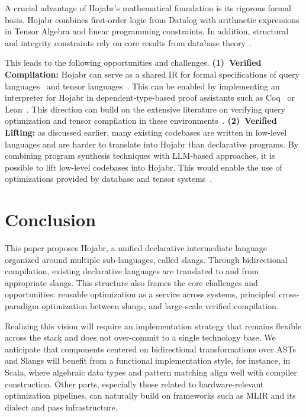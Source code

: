 \documentclass[sigconf,nonacm]{acmart}
\begin{document}
A crucial advantage of Hojabr's mathematical foundation is its rigorous formal basis. Hojabr combines first-order logic from Datalog with arithmetic expressions in Tensor Algebra and linear programming constraints. In addition, structural and integrity constraints rely on core results from database theory~\cite{abiteboul1995foundations}.

This leads to the following opportunities and challenges. \textbf{(1)~Verified Compilation:} Hojabr can serve as a shared IR for formal specifications of query languages~\cite{DBLP:conf/cidr/0001L24} and tensor languages~\cite{kovach2023indexed,liu2024verified}. This can be enabled by implementing an interpreter for Hojabr in dependent-type-based proof assistants such as Coq~\cite{barras1997coq} or Lean~\cite{de2015lean}. This direction can build on the extensive literature on verifying query optimization and tensor compilation in these environments~\cite{liu2022verified,DBLP:journals/pacmpl/AuerbachHMSS17,DBLP:conf/pldi/ChuWCS17}. 
\textbf{(2)~Verified Lifting:} as discussed earlier, many existing codebases are written in low-level languages and are harder to translate into Hojabr than declarative programs. By combining program synthesis techniques with LLM-based approaches, it is possible to lift low-level codebases into Hojabr. This would enable the use of optimizations provided by database and tensor systems~\cite{cheung2013optimizing, li2025guided}.

\section{Conclusion}
This paper proposes Hojabr, a unified declarative intermediate language organized around multiple sub-languages, called slangs. Through bidirectional compilation, existing declarative languages are translated to and from appropriate slangs. This structure also frames the core challenges and opportunities: reusable optimization as a service across systems, principled cross-paradigm optimization between slangs, and large-scale verified compilation. 

Realizing this vision will require an implementation strategy that remains flexible across the stack and does not over-commit to a single technology base. We anticipate that components centered on bidirectional transformations over ASTs and Slangs will benefit from a functional implementation style, for instance, in Scala, where algebraic data types and pattern matching align well with compiler construction. Other parts, especially those related to hardware-relevant optimization pipelines, can naturally build on frameworks such as MLIR and its dialect and pass infrastructure.

% 



\end{document}
